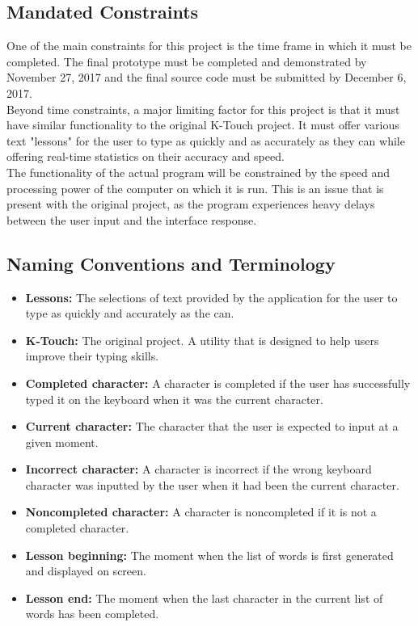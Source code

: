 \documentclass[12pt, titlepage]{article}
\begin{document}
\subsection{Mandated Constraints}
\indent \indent One of the main constraints for this project is the time frame in which it must be completed. The final prototype must be completed and demonstrated by November 27, 2017 and the final source code must be submitted by December 6, 2017.
\\
\indent Beyond time constraints, a major limiting factor for this project is that it must have similar functionality to the original K-Touch project. It must offer various text "lessons" for the user to type as quickly and as accurately as they can while offering real-time statistics on their accuracy and speed. 
\\
\indent The functionality of the actual program will be constrained by the speed and processing power of the computer on which it is run. This is an issue that is present with the original project, as the program experiences heavy delays between the user input and the interface response.


\subsection{Naming Conventions and Terminology}

\begin{itemize}
    \item \textbf{Lessons:} The selections of text provided by the application for the user to type as quickly and accurately as the can.
    \item \textbf{K-Touch:} The original project. A utility that is designed to help users improve their typing skills.
    \item\textbf{ Completed character:} A character is completed if the user has successfully typed it on the keyboard when it was the current character. 
    \item \textbf{Current character:} The character that the user is expected to input at a given moment.
    \item\textbf{ Incorrect character:} A character is incorrect if the wrong keyboard character was inputted by the user when it had been the current character.
    \item\textbf{ Noncompleted character:} A character is noncompleted if it is not a completed character.
    \item \textbf{Lesson beginning:} The moment when the list of words is first generated and displayed on screen.
    \item \textbf{Lesson end:} The moment when the last character in the current list of words has been completed.
\end{itemize}
\end{document}
